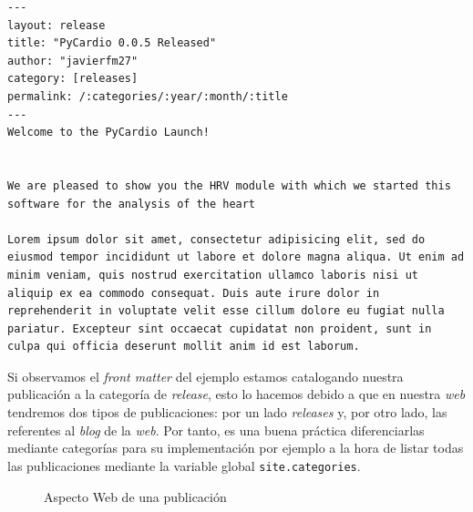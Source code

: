 \begin{lstlisting}[caption=Ejemplo de publicación para la sección \textit{release},label={code:release1}]
  ---
layout: release
title: "PyCardio 0.0.5 Released"
author: "javierfm27"
category: [releases]
permalink: /:categories/:year/:month/:title
---
Welcome to the PyCardio Launch!


We are pleased to show you the HRV module with which we started this software for the analysis of the heart

Lorem ipsum dolor sit amet, consectetur adipisicing elit, sed do eiusmod tempor incididunt ut labore et dolore magna aliqua. Ut enim ad minim veniam, quis nostrud exercitation ullamco laboris nisi ut aliquip ex ea commodo consequat. Duis aute irure dolor in reprehenderit in voluptate velit esse cillum dolore eu fugiat nulla pariatur. Excepteur sint occaecat cupidatat non proident, sunt in culpa qui officia deserunt mollit anim id est laborum.

\end{lstlisting}

Si observamos el \textit{front matter} del ejemplo estamos catalogando nuestra publicación a la categoría de \textit{release}, esto lo hacemos debido a que en nuestra \textit{web} tendremos dos tipos de publicaciones: por un lado \textit{releases} y, por otro lado, las referentes al \textit{blog} de la \textit{web}. Por tanto, es una buena práctica diferenciarlas mediante categorías para su implementación por ejemplo a la hora de listar todas las publicaciones mediante la variable global \texttt{site.categories}.

\begin{figure}[H]
    \centering
    \caption{Aspecto Web de una publicación}
    \label{fig:onlyreleaseWeb}
\end{figure}

